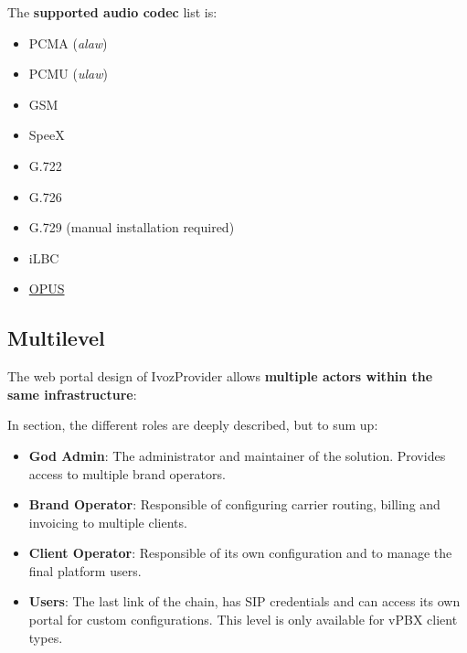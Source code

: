 \documentclass[letterpaper,10pt,spanish]{sphinxmanual}
\begin{document}
The \textbf{supported audio codec} list is:
\begin{itemize}
\item {} 
PCMA (\emph{alaw})

\item {} 
PCMU (\emph{ulaw})

\item {} 
GSM

\item {} 
SpeeX

\item {} 
G.722

\item {} 
G.726

\item {} 
G.729 (manual installation required)

\item {} 
iLBC

\item {} 
\href{http://opus-codec.org/}{OPUS}

\end{itemize}


\subsection{Multilevel}
\label{basic_concepts/intro/what_is_ivozprovider:multilevel}\label{basic_concepts/intro/what_is_ivozprovider:id1}
The web portal design of IvozProvider allows \textbf{multiple actors within the
same infrastructure}:

\noindent{}

In {\hyperref[basic_concepts/operation_roles/index:operation\string-roles]{}} section, the different roles are deeply
described, but to sum up:
\begin{itemize}
\item {} 
\textbf{God Admin}: The administrator and maintainer of the solution. Provides
access to multiple brand operators.

\item {} 
\textbf{Brand Operator}: Responsible of configuring carrier routing, billing and invoicing to
multiple clients.

\item {} 
\textbf{Client Operator}: Responsible of its own configuration and to manage the final platform users.

\item {} 
\textbf{Users}: The last link of the chain, has SIP credentials and can access
its own portal for custom configurations. This level is only available for vPBX client types.

\end{itemize}
\end{document}
